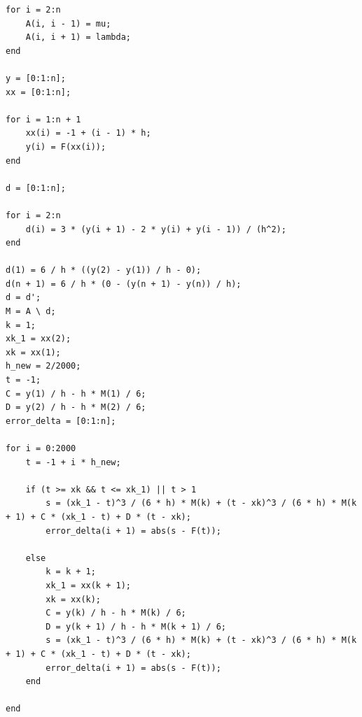 \documentclass[12pt,a4paper,UTF8]{ctexart}
\theoremstyle{nonumberplain}
\begin{document}
\begin{enumerate}
\begin{enumerate}
\begin{lstlisting}[frame=single]
for i = 2:n
    A(i, i - 1) = mu;
    A(i, i + 1) = lambda;
end

y = [0:1:n];
xx = [0:1:n];

for i = 1:n + 1
    xx(i) = -1 + (i - 1) * h;
    y(i) = F(xx(i));
end

d = [0:1:n];

for i = 2:n
    d(i) = 3 * (y(i + 1) - 2 * y(i) + y(i - 1)) / (h^2);
end

d(1) = 6 / h * ((y(2) - y(1)) / h - 0);
d(n + 1) = 6 / h * (0 - (y(n + 1) - y(n)) / h);
d = d';
M = A \ d;
k = 1;
xk_1 = xx(2);
xk = xx(1);
h_new = 2/2000;
t = -1;
C = y(1) / h - h * M(1) / 6;
D = y(2) / h - h * M(2) / 6;
error_delta = [0:1:n];

for i = 0:2000
    t = -1 + i * h_new;

    if (t >= xk && t <= xk_1) || t > 1
        s = (xk_1 - t)^3 / (6 * h) * M(k) + (t - xk)^3 / (6 * h) * M(k + 1) + C * (xk_1 - t) + D * (t - xk);
        error_delta(i + 1) = abs(s - F(t));

    else
        k = k + 1;
        xk_1 = xx(k + 1);
        xk = xx(k);
        C = y(k) / h - h * M(k) / 6;
        D = y(k + 1) / h - h * M(k + 1) / 6;
        s = (xk_1 - t)^3 / (6 * h) * M(k) + (t - xk)^3 / (6 * h) * M(k + 1) + C * (xk_1 - t) + D * (t - xk);
        error_delta(i + 1) = abs(s - F(t));
    end

end


\end{lstlisting}
\end{enumerate}
\end{enumerate}
\end{document}
